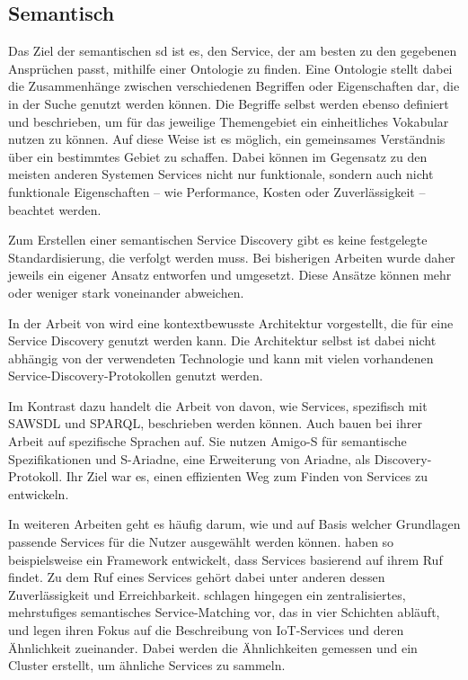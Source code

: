 \subsection{Semantisch}\label{subsec:semanticsd}

Das Ziel der semantischen \gls{sd} ist es, den Service, der am besten zu den gegebenen Ansprüchen passt, mithilfe einer Ontologie zu finden.
Eine Ontologie stellt dabei die Zusammenhänge zwischen verschiedenen Begriffen oder Eigenschaften dar, die in der Suche genutzt werden können. Die Begriffe selbst werden ebenso definiert und beschrieben, um für das jeweilige Themengebiet ein einheitliches Vokabular nutzen zu können. Auf diese Weise ist es möglich, ein gemeinsames Verständnis über ein bestimmtes Gebiet zu schaffen.
Dabei können im Gegensatz zu den meisten anderen Systemen Services nicht nur funktionale, sondern auch nicht funktionale Eigenschaften -- wie Performance, Kosten oder Zuverlässigkeit -- beachtet werden.

Zum Erstellen einer semantischen Service Discovery gibt es keine festgelegte Standardisierung, die verfolgt werden muss.
Bei bisherigen Arbeiten wurde daher jeweils ein eigener Ansatz entworfen und umgesetzt. Diese Ansätze können mehr oder weniger stark voneinander abweichen.

In der Arbeit von \citeauthor{Suraci.2008.CaSSD} \autocite{Suraci.2008.CaSSD} wird eine kontextbewusste Architektur vorgestellt, die für eine Service Discovery genutzt werden kann. Die Architektur selbst ist dabei nicht abhängig von der verwendeten Technologie und kann mit vielen vorhandenen Service-Discovery-Protokollen genutzt werden.

Im Kontrast dazu handelt die Arbeit von \citeauthor{Iqbal.12320081252008.SSDuSaS} \autocite{Iqbal.12320081252008.SSDuSaS} davon, wie Services, spezifisch mit SAWSDL und SPARQL, beschrieben werden können.
Auch \citeauthor{BenMokhtar.2006.ESSDiPCE} \autocite{BenMokhtar.2006.ESSDiPCE} bauen bei ihrer Arbeit auf spezifische Sprachen auf. Sie nutzen Amigo-S für semantische Spezifikationen und S-Ariadne, eine Erweiterung von Ariadne, als Discovery-Protokoll. Ihr Ziel war es, einen effizienten Weg zum Finden von Services zu entwickeln.

In weiteren Arbeiten geht es häufig darum, wie und auf Basis welcher Grundlagen passende Services für die Nutzer ausgewählt werden können.
\citeauthor{Majithia.2004.Rbssd} \autocite{Majithia.2004.Rbssd} haben so beispielsweise ein Framework entwickelt, dass Services basierend auf ihrem Ruf findet. Zu dem Ruf eines Services gehört dabei unter anderen dessen Zuverlässigkeit und Erreichbarkeit.
\citeauthor{Jia.2017} \autocite{Jia.2017} schlagen hingegen ein zentralisiertes, mehrstufiges semantisches Service-Matching vor, das in vier Schichten abläuft, und
\citeauthor{Zhao.2017} \autocite{Zhao.2017} legen ihren Fokus auf die Beschreibung von IoT-Services und deren Ähnlichkeit zueinander. Dabei werden die Ähnlichkeiten gemessen und ein Cluster erstellt, um ähnliche Services zu sammeln.

